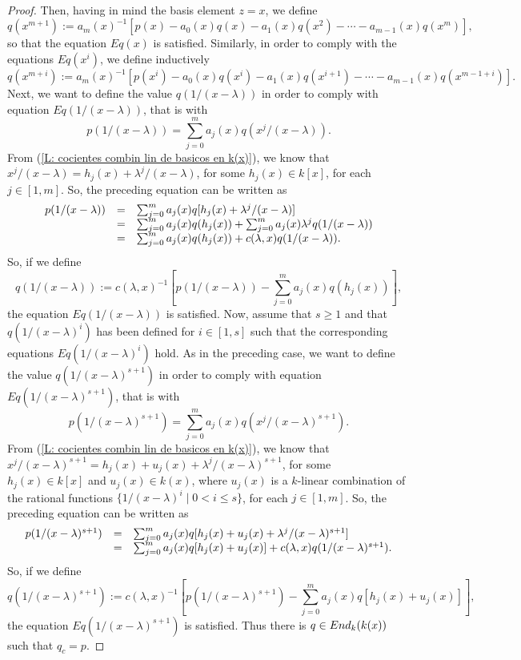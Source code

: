 \documentclass[10pt,a4paper]{amsart}
\newcommand{\End}{{ \rm End }}
\begin{document}
\begin{proof}
Then, having in mind the basis element $z=x$,  we define 
$$q(x^{m+1}):=a_m(x)^{-1}[p(x)-a_0(x)q(x)-a_1(x)q(x^2)-\cdots -a_{m-1}(x)q(x^m)],$$
so that the equation $Eq(x)$ is satisfied. Similarly, in order to comply with the equations $Eq(x^i)$, we define inductively 
$$q(x^{m+i}):=a_m(x)^{-1}[p(x^i)-a_0(x)q(x^i)-a_1(x)q(x^{i+1})-\cdots -a_{m-1}(x)q(x^{m-1+i})].$$
Next, we want to define the value $q(1/(x-\lambda))$ in order to comply with equation $Eq(1/(x-\lambda))$, that is with 
$$p(1/(x-\lambda))=\sum_{j=0}^ma_j(x)q(x^j/(x-\lambda)).$$
From (\ref{L: cocientes combin lin de basicos en k(x)}), we know that $x^j/(x-\lambda)=h_j(x)+\lambda^j/(x-\lambda)$, for some $h_j(x)\in k[x]$, for each $j\in [1,m]$. So, the preceding equation can be written as 
$$\begin{matrix}
p(1/(x-\lambda))
&=&
\sum_{j=0}^ma_j(x)q[h_j(x)+\lambda^j/(x-\lambda)]\hfill\\
&=&
\sum_{j=0}^ma_j(x)q(h_j(x)) +\sum_{j=0}^ma_j(x)\lambda^jq(1/(x-\lambda))\hfill\\
&=&
\sum_{j=0}^ma_j(x)q(h_j(x)) +c(\lambda,x)q(1/(x-\lambda)).\hfill\\
\end{matrix}
$$
So, if we define 
$$q(1/(x-\lambda)):=c(\lambda,x)^{-1}\left[p(1/(x-\lambda))-\sum_{j=0}^ma_j(x)q(h_j(x))\right],$$
the equation $Eq(1/(x-\lambda))$ is satisfied. Now, assume that $s\geq 1$ and that $q(1/(x-\lambda)^i)$ has been defined for $i\in [1,s]$ such that the corresponding equations $Eq(1/(x-\lambda)^i)$ hold. As in the preceding case, we 
want to define the value $q(1/(x-\lambda)^{s+1})$ in order to comply with equation $Eq(1/(x-\lambda)^{s+1})$, that is with 
$$p(1/(x-\lambda)^{s+1})=\sum_{j=0}^ma_j(x)q(x^j/(x-\lambda)^{s+1}).$$
From (\ref{L: cocientes combin lin de basicos en k(x)}), we know that $x^j/(x-\lambda)^{s+1}=h_j(x)+u_j(x)+\lambda^j/(x-\lambda)^{s+1}$, for some $h_j(x)\in k[x]$ and $u_j(x)\in k(x)$, where $u_j(x)$ is a $k$-linear combination of the rational functions $\{1/(x-\lambda)^i\mid 0<i\leq s\}$, for each $j\in [1,m]$. So, the preceding equation can be written as 
$$\begin{matrix}
p(1/(x-\lambda)^{s+1})
&=&
\sum_{j=0}^ma_j(x)q[h_j(x)+u_j(x)+\lambda^j/(x-\lambda)^{s+1}]\hfill\\
&=&
\sum_{j=0}^ma_j(x)q[h_j(x)+u_j(x)] +c(\lambda,x)q(1/(x-\lambda)^{s+1}).\hfill\\
\end{matrix}
$$
So, if we define 
$$q(1/(x-\lambda)^{s+1}):=c(\lambda,x)^{-1}\left[p(1/(x-\lambda)^{s+1})-\sum_{j=0}^ma_j(x)q[h_j(x)+u_j(x)]\right],$$
the equation $Eq(1/(x-\lambda)^{s+1})$ is satisfied. Thus there is $q\in \End_k(k(x))$ such that $q_c=p$. 
 \medskip


\end{proof}
\end{document}
